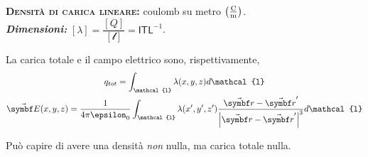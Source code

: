 \begin{units}~\\
	\textbf{\textsc{Densità di carica lineare:}} coulomb su metro $\left(\unit[per-mode = fraction]{\coulomb\per\meter}\right)$.\\
	\textit{\textbf{Dimensioni:}} $[\lambda]=\dfrac{[Q]}{[\mathcal{l}]}=\mathsf{I}\mathsf{T}\mathsf{L}^{-1}$.
\end{units}
La carica totale e il campo elettrico sono, rispettivamente,
\begin{gather}
	q_{tot}=\int_\mathcal{l}\lambda(x,y,z)d\mathcal{l}\\
	\vba{E}(x,y,z)=\frac{1}{4\pi\epsilon_0}\int_\mathcal{l}\lambda(x',y',z')\frac{\vba{r}-\vba{r}'}{\abs{\vba{r}-\vba{r}'}^3}d\mathcal{l}
\end{gather}
\begin{observe}
	Può capire di avere una densità \textit{non} nulla, ma carica totale nulla.
\end{observe}
